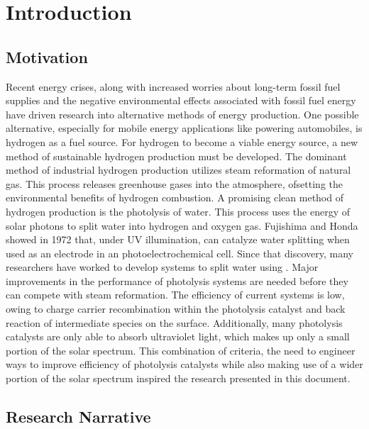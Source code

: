 
\chapter{Introduction}
\label{ch:introduction}


\section{Motivation}
\label{sec:intro.motivation}


Recent energy crises, along with increased worries about long-term fossil fuel supplies
and the negative environmental effects associated with fossil fuel energy have driven
research into alternative methods of energy production. One possible alternative,
especially for mobile energy applications like powering automobiles, is hydrogen as a fuel
source. For hydrogen to become a viable energy source, a new method of sustainable
hydrogen production must be developed. The dominant method of industrial hydrogen
production utilizes steam reformation of natural gas.\cite{Report:2004wb} This process
releases greenhouse gases into the atmosphere, ofsetting the environmental benefits of
hydrogen combustion.
A promising clean method of hydrogen production is the photolysis of water. This process
uses the energy of solar photons to split water into hydrogen and oxygen gas. Fujishima
and Honda\cite{Fujishima:1972hc} showed in 1972 that, under UV illumination,  can
catalyze water splitting when used as an electrode in an photoelectrochemical cell. Since
that discovery, many researchers have worked to develop systems to split water using
.\cite{User:2001tg,Frank:1987hd,Karakitsou:1993fq,Linsebigler:1995gi,Schrauzer:1977ex} Major improvements in the performance of photolysis systems are needed before they
can compete with steam reformation. The efficiency of current systems is low, owing to
charge carrier recombination within the photolysis catalyst and back reaction of
intermediate species on the surface. Additionally, many photolysis catalysts are only able
to absorb ultraviolet light, which makes up only a small portion of the solar spectrum.
This combination of criteria, the need to engineer ways to improve efficiency of
photolysis catalysts while also making use of a wider portion of the solar spectrum
inspired the research presented in this document.


\section{Research Narrative}
\label{sec:intro.objectives}


